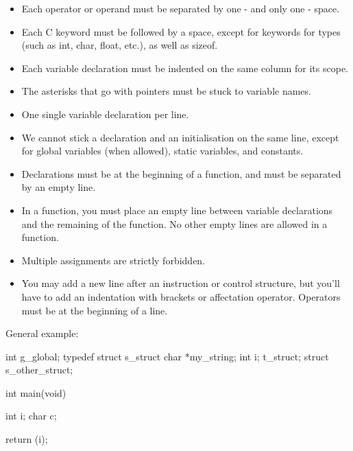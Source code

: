 \documentclass{42-en}
\begin{document}
\begin{itemize}
                \item Each operator or operand must be separated by one
                 - and only one - space.

                \item Each C keyword must be followed by a space, except for
                  keywords for types (such as int, char, float, etc.),
                  as well as sizeof.

                \item Each variable declaration must be indented on the same
                  column for its scope.

                \item The asterisks that go with pointers must be stuck to
                  variable names.

                \item One single variable declaration per line.

                \item We cannot stick a declaration and an initialisation
                  on the same line, except for global variables (when allowed),
                  static variables, and constants.

                \item Declarations must be at the beginning of a function,
                  and must be separated by an empty line.

                \item In a function, you must place an empty line between 
                    variable declarations and the remaining of the function.
                    No other empty lines are allowed in a function.

                \item Multiple assignments are strictly forbidden.

                \item You may add a new line after an instruction or
                  control structure, but you'll have to add an
                  indentation with brackets or affectation operator.
                  Operators must be at the beginning of a line.

            \end{itemize}

            \newpage

            General example:
            \begin{42ccode}
int             g_global;
typedef struct  s_struct
{
    char    *my_string;
    int     i;
}               t_struct;
struct          s_other_struct;

int     main(void)
{
    int     i;
    char    c;

    return (i);
}
            \end{42ccode}
            \newpage
\end{document}
